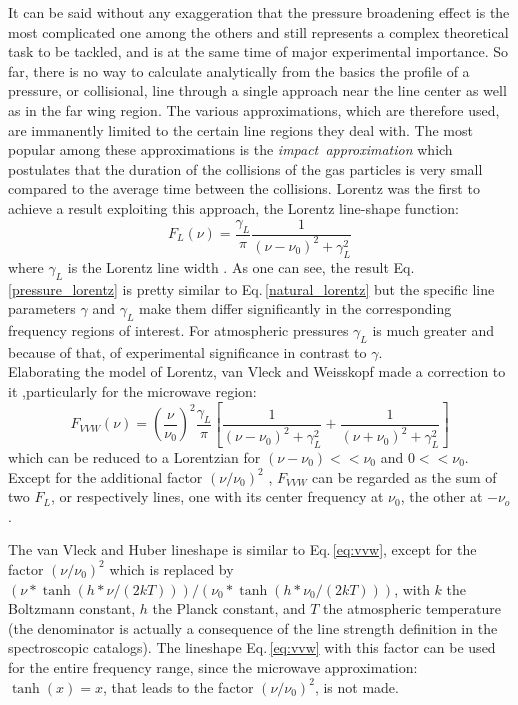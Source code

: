 It can be said without any exaggeration that the pressure broadening
effect is the most complicated one among the others and still
represents a complex theoretical task to be tackled, and is at the
same time of major experimental importance. So far, there is no way to
calculate analytically from the basics the profile of a pressure, or
collisional, line through a single approach near the line center as
well as in the far wing region. The various approximations, which are
therefore used, are immanently limited to the certain line regions
they deal with.  The most popular among these approximations is the
{\it{impact~approximation}} which postulates that the duration of the
collisions of the gas particles is very small compared to the average
time between the collisions. Lorentz was the first to achieve a result
exploiting this approach, the Lorentz line-shape function:
\begin{equation}\label{pressure_lorentz}
 F_L(\nu)=\frac{\gamma_L}{\pi}\frac{1}{(\nu-\nu_0)^2+\gamma_L^2}
\end{equation}
where $\gamma_L$ is the Lorentz line width \citep{thorne:99}. As one
can see, the result Eq.\,\ref{pressure_lorentz} is pretty similar to
Eq.\,\ref{natural_lorentz} but the specific line parameters $\gamma$
and $\gamma_L$ make them differ significantly in the corresponding
frequency regions of interest. For atmospheric pressures $\gamma_L$ is
much greater and because of that, of experimental
significance in contrast to $\gamma$.\\
Elaborating the model of Lorentz, van Vleck and Weisskopf made a
correction to it \citep{vanvleck:45},particularly for the microwave
region:
\begin{equation}\label{eq:vvw}
 F_{VVW} (\nu)=\left(\frac{\nu}{\nu_0}\right)^2\frac{\gamma_L}{\pi}
 \left[\frac{1}{(\nu-\nu_0)^2+\gamma_L^2}+\frac{1}{(\nu+\nu_0)^2+\gamma_L^2}\right]
\end{equation}
which can be reduced to a Lorentzian for $(\nu-\nu_0) << \nu_0$ and $0
<< \nu_0$. Except for the additional factor $(\nu/\nu_0)^2$ ,
$F_{VVW}$ can be regarded as the sum of two $F_L$, or respectively
lines, one with its center frequency at $\nu_0$, the other at
$-\nu_o$.

The van Vleck and Huber lineshape \citep{vanvleckhuber:77} is similar
to Eq.\,\ref{eq:vvw}, except for the factor $(\nu/\nu_0)^2$ which is
replaced by $(\nu * \tanh(h*\nu/(2kT)))/(\nu_0 *
\tanh(h*\nu_0/(2kT)))$, with $k$ the Boltzmann constant, $h$ the Planck
constant, and $T$ the atmospheric temperature (the denominator is
actually a consequence of the line strength definition in the
spectroscopic catalogs). The lineshape Eq.\,\ref{eq:vvw} with this
factor can be used for the entire frequency range, since
the microwave approximation: $\tanh(x) = x$, that leads to the factor
$(\nu/\nu_0)^2$, is not made.

